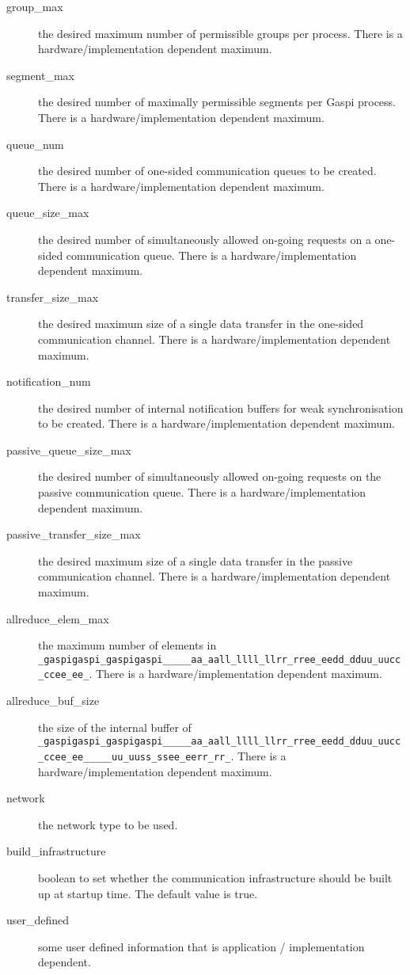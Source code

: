 \documentclass[a4paper]{article}
\makeatletter
\newlength{\st}\setlength{\st}{0pt}
\newcommand{\zerowsep}{\hskip 0pt plus 0.1pt minus 0.1pt}
\newcommand{\ZSEP}[1]{\ifx#1\@@@EOZ@@@\let\next\relax\else\ifx#1\_#1\zerowsep\else#1\fi\let\next\ZSEP\fi\next}
\newcommand{\zsep}[1]{\ZSEP{}#1\@@@EOZ@@@}
\newcommand{\gaspiprefix}{gaspi}
\newcommand{\GASPI}{{\sc Gaspi}}
\newcommand{\function}[1]{{\tt #1}}
\newcommand{\gaspifunction}[1]{\function{\protect\zsep{\gaspiprefix\_#1}}}
\makeatother
\begin{document}
\begin{description}
\item[group\_max] the desired maximum number of permissible groups per process. There is a hardware/implementation dependent maximum.
\item[segment\_max] the desired number of maximally permissible segments per \GASPI{} process.
There is a hardware/implementation dependent maximum.
\item[queue\_num] the desired number of one-sided communication queues to be created. There is a hardware/implementation
dependent maximum.
\item[queue\_size\_max] the desired number of simultaneously allowed on-going requests on a one-sided communication queue.
There is a hardware/implementation dependent maximum.
\item[transfer\_size\_max] the desired maximum size of a single data
  transfer in the one-sided communication channel.
There is a hardware/implementation dependent maximum.
\item[notification\_num] the desired number of internal notification buffers for weak synchronisation to be created.
There is a hardware/implementation dependent maximum.
\item[passive\_queue\_size\_max] the desired number of simultaneously allowed on-going requests on the
passive communication queue. There is a hardware/implementation dependent maximum.
\item[passive\_transfer\_size\_max] the desired maximum size of a
  single data transfer in the passive communication channel.
There is a hardware/implementation dependent maximum.
\item[allreduce\_elem\_max] the maximum number of elements in \gaspifunction{allreduce}.
There is a hardware/implementation dependent maximum.
\item[allreduce\_buf\_size] the size of the internal buffer of \gaspifunction{allreduce\_user}.
There is a hardware/implementation dependent maximum.
\item[network] the network type to be used.
\item[build\_infrastructure] boolean to set whether the communication infrastructure should
be built up at startup time. The default value is true.
\item[user\_defined] some user defined information that is application / implementation dependent.
\end{description}
\end{document}
